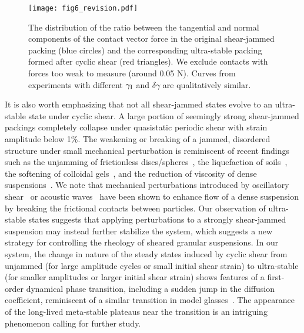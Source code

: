 \documentclass[twocolumn,showkeys,superscriptaddress,preprintnumbers,amsmath,amssymb,showpacs,prx,longbibliography]{revtex4-2}
\begin{document}
\begin{CJK*}{UTF8}{gbsn}
\begin{figure}[t]
    \centering
    \texttt{[image: fig6\_revision.pdf]}
    \caption{
    The distribution of the ratio between the tangential and normal components of the contact vector force in the original shear-jammed packing (blue circles) and the corresponding ultra-stable packing formed after cyclic shear (red triangles). 
    We exclude contacts with forces too weak to measure (around 0.05 N). {\color{black} Curves from experiments with different $\gamma_{\rm I}$ and $\delta\gamma$ are qualitatively similar.}
    }
    \label{fig:contact-network}
\end{figure}

It is also worth emphasizing that not all shear-jammed states evolve to an ultra-stable state under cyclic shear. A large portion of seemingly strong shear-jammed packings completely collapse under quasistatic periodic shear with strain amplitude below 1\%. The weakening or breaking of a jammed, disordered structure under small mechanical perturbation is
reminiscent of recent findings such as the unjamming of frictionless discs/spheres~\cite{dagois2012_prl,das2020_pnas,Babu_2021Soft}, the liquefaction of soils~\cite{ming2021_pre,amini2021_GL}, the softening of colloidal gels~\cite{Gibaud2020_prx,Dages2021_jor}, and the reduction of viscosity of dense suspensions~\cite{lin2016_pnas,ness2018_sa,Sehgal2019_prl}.
We note that mechanical perturbations introduced by oscillatory shear~\cite{lin2016_pnas,ness2018_sa} or acoustic waves~\cite{Sehgal2019_prl} have been shown to enhance flow of a dense suspension by breaking the frictional contacts between particles. Our observation of  ultra-stable states suggests that applying perturbations to a strongly shear-jammed suspension may instead further stabilize the system, which suggests a new strategy for controlling the rheology of sheared granular suspensions. In our system, the change in nature of the steady states induced by cyclic shear from unjammed (for large amplitude cycles or small initial shear strain) to ultra-stable (for smaller amplitudes or larger initial shear strain) shows features of a first-order dynamical phase transition, including a sudden jump in the diffusion coefficient, reminiscent of a similar transition in model glasses~\cite{kawasaki2016_pre}. The appearance of the long-lived meta-stable plateaus near the transition is an intriguing phenomenon calling for further study.




\end{CJK*}
\end{document}
